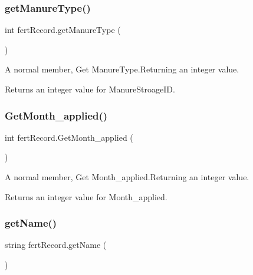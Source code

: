 \subsubsection{\texorpdfstring{getManureType()}{getManureType()}}
{\footnotesize\ttfamily int fert\+Record.\+get\+Manure\+Type (\begin{DoxyParamCaption}{ }\end{DoxyParamCaption})\hspace{0.3cm}{\ttfamily [inline]}}



A normal member, Get Manure\+Type.\+Returning an integer value. 

\begin{DoxyReturn}{Returns}
an integer value for Manure\+Stroage\+ID. 
\end{DoxyReturn}
\mbox{\label{classfert_record_a8d0d7390de337843d5ae1f37d73013d2}} 
\subsubsection{\texorpdfstring{GetMonth\_applied()}{GetMonth\_applied()}}
{\footnotesize\ttfamily int fert\+Record.\+Get\+Month\+\_\+applied (\begin{DoxyParamCaption}{ }\end{DoxyParamCaption})\hspace{0.3cm}{\ttfamily [inline]}}



A normal member, Get Month\+\_\+applied.\+Returning an integer value. 

\begin{DoxyReturn}{Returns}
an integer value for Month\+\_\+applied. 
\end{DoxyReturn}
\mbox{\label{classfert_record_abcaf5c084be3ff3a3f60bce067c3a4cc}} 
\subsubsection{\texorpdfstring{getName()}{getName()}}
{\footnotesize\ttfamily string fert\+Record.\+get\+Name (\begin{DoxyParamCaption}{ }\end{DoxyParamCaption})\hspace{0.3cm}{\ttfamily [inline]}}



